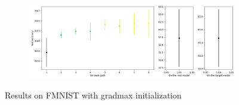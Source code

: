 \documentclass{article}
\begin{document}
\begin{figure}[htbp]
    \vspace{0.5cm}
    
    \begin{subfigure}[b]{0.5\textwidth}
        \centering
        \includegraphics[width=\textwidth]{imgs/statistical_reliability_FMNIST_gradmax_2024_05_02_15_23_40.png}
    \end{subfigure}
    \caption{Results on FMNIST with gradmax initialization}
\end{figure}
\end{document}
